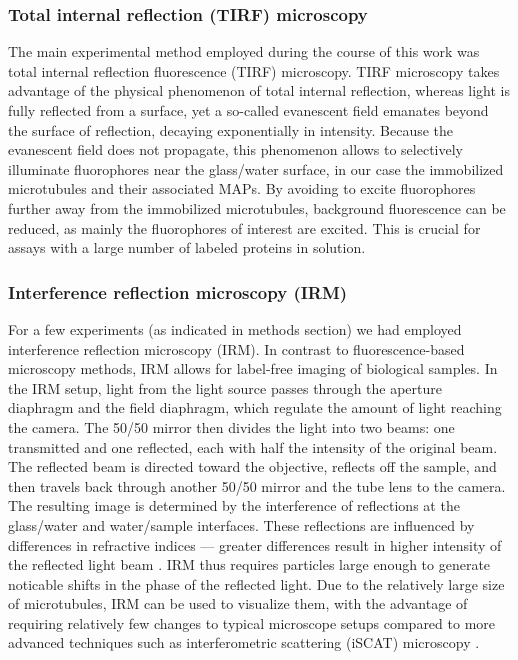 \subsubsection{Total internal reflection (TIRF) microscopy}
The main experimental method employed during the course of this work was total internal reflection fluorescence (TIRF) microscopy. TIRF microscopy takes advantage of the physical phenomenon of total internal reflection, whereas light is fully reflected from a surface, yet a so-called evanescent field emanates beyond the surface of reflection, decaying exponentially in intensity. Because the evanescent field does not propagate, this phenomenon allows to selectively illuminate fluorophores near the glass/water surface, in our case the immobilized microtubules and their associated MAPs. By avoiding to excite fluorophores further away from the immobilized microtubules, background fluorescence can be reduced, as mainly the fluorophores of interest are excited. This is crucial for assays with a large number of labeled proteins in solution. 

\subsubsection{Interference reflection microscopy (IRM)}
For a few experiments (as indicated in methods section) we had employed interference reflection microscopy (IRM). In contrast to fluorescence-based microscopy methods, IRM allows for label-free imaging of biological samples. In the IRM setup, light from the light source passes through the aperture diaphragm and the field diaphragm, which regulate the amount of light reaching the camera. The 50/50 mirror then divides the light into two beams: one transmitted and one reflected, each with half the intensity of the original beam. The reflected beam is directed toward the objective, reflects off the sample, and then travels back through another 50/50 mirror and the tube lens to the camera. The resulting image is determined by the interference of reflections at the glass/water and water/sample interfaces. These reflections are influenced by differences in refractive indices — greater differences result in higher intensity of the reflected light beam \parencite{barr2009interference}. IRM thus requires particles large enough to generate noticable shifts in the phase of the reflected light. Due to the relatively large size of microtubules, IRM can be used to visualize them, with the advantage of requiring relatively few changes to typical microscope setups compared to more advanced techniques such as interferometric scattering (iSCAT) microscopy \parencite{Mahamdeh2018}.

